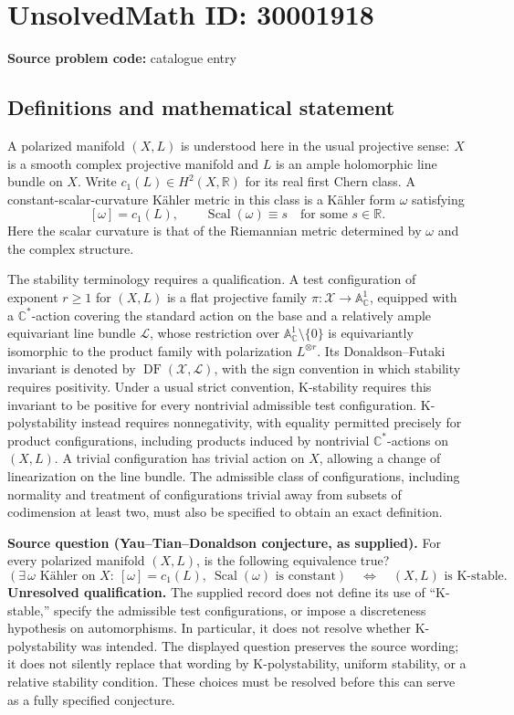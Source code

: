 \documentclass[11pt]{article}
\newcommand{\R}{\mathbb{R}}
\newcommand{\C}{\mathbb{C}}
\newcommand{\A}{\mathbb{A}}
\begin{document}
\section*{UnsolvedMath ID: 30001918}
\textbf{Source problem code:} catalogue entry
\subsection{Definitions and mathematical statement}
A polarized manifold \((X,L)\) is understood here in the usual projective sense: \(X\) is a smooth complex projective manifold and \(L\) is an ample holomorphic line bundle on \(X\). Write \(c_1(L)\in H^2(X,\R)\) for its real first Chern class. A constant-scalar-curvature K\"ahler metric in this class is a K\"ahler form \(\omega\) satisfying
\[
[\omega]=c_1(L),\qquad \operatorname{Scal}(\omega)\equiv s
\quad\text{for some }s\in\R.
\]
Here the scalar curvature is that of the Riemannian metric determined by \(\omega\) and the complex structure.

The stability terminology requires a qualification. A test configuration of exponent \(r\geq 1\) for \((X,L)\) is a flat projective family \(\pi:\mathcal X\to\A^1_{\C}\), equipped with a \(\C^*\)-action covering the standard action on the base and a relatively ample equivariant line bundle \(\mathcal L\), whose restriction over \(\A^1_{\C}\setminus\{0\}\) is equivariantly isomorphic to the product family with polarization \(L^{\otimes r}\). Its Donaldson--Futaki invariant is denoted by \(\operatorname{DF}(\mathcal X,\mathcal L)\), with the sign convention in which stability requires positivity. Under a usual strict convention, K-stability requires this invariant to be positive for every nontrivial admissible test configuration. K-polystability instead requires nonnegativity, with equality permitted precisely for product configurations, including products induced by nontrivial \(\C^*\)-actions on \((X,L)\). A trivial configuration has trivial action on \(X\), allowing a change of linearization on the line bundle. The admissible class of configurations, including normality and treatment of configurations trivial away from subsets of codimension at least two, must also be specified to obtain an exact definition.

\textbf{Source question (Yau--Tian--Donaldson conjecture, as supplied).} For every polarized manifold \((X,L)\), is the following equivalence true?
\[
\left(\exists\,\omega\text{ K\"ahler on }X:\ [\omega]=c_1(L),\ \operatorname{Scal}(\omega)\text{ is constant}\right)
\quad\Longleftrightarrow\quad
(X,L)\text{ is K-stable}.
\]
\textbf{Unresolved qualification.} The supplied record does not define its use of ``K-stable,'' specify the admissible test configurations, or impose a discreteness hypothesis on automorphisms. In particular, it does not resolve whether K-polystability was intended. The displayed question preserves the source wording; it does not silently replace that wording by K-polystability, uniform stability, or a relative stability condition. These choices must be resolved before this can serve as a fully specified conjecture.
\end{document}
